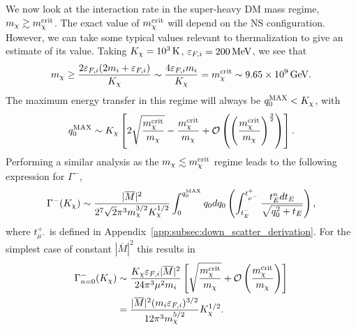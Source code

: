 We now look at the interaction rate in the super-heavy DM mass regime, $m_\chi \gtrsim m_\chi^{\rm crit}$.
The exact value of $m_\chi^{\rm crit}$ will depend on the NS configuration. However, we can take some typical values relevant to thermalization to give an estimate of its value. Taking $K_\chi=10^3{\rm \,K}$, $\varepsilon_{F,i}=200{\rm \,MeV}$, we see that
\begin{equation}
    m_\chi \ge \frac{2\varepsilon_{F,i}(2m_i+\varepsilon_{F,i})}{ K_\chi} \sim \frac{4\varepsilon_{F,i} m_i}{K_\chi} = m_\chi^{\rm crit}\sim 9.65\times10^9{\rm \,GeV}. 
    \label{qpp:eq:mcrit_def}
\end{equation}
The maximum energy transfer in this regime will always be $q_0^{\rm MAX}<K_\chi$, with
\begin{equation}
    q_0^{\rm MAX}\sim K_\chi\left[2\sqrt{\frac{m_\chi^{\rm crit}}{m_\chi }} - \frac{m_\chi^{\rm crit}}{m_\chi } +\mathcal{O}\left(\left(\frac{m_\chi^{\rm crit}}{m_\chi}\right)^{\frac{3}{2}}\right)\right].
 \end{equation}
Performing a similar analysis as the $m_\chi \lesssim m_\chi^{\rm crit}$ regime leads to the following expression for $\Gamma^-$,
\begin{equation}
\Gamma^{-}(K_\chi) \sim \frac{|\overline{M}|^2}{2^7\sqrt{2}\pi^3m_\chi^{3/2}K_\chi^{1/2}}\int_0^{	q_0^{\rm MAX}}q_0 dq_0 \left(\int_{t_{E}^{-}}^{t_{\mu^-}^{+}} \frac{t_E^n dt_E }{\sqrt{q_0^2+t_E}} \right),  
\end{equation} 
where $t_{\mu^-}^+$ is defined in Appendix~\ref{app:subsec:down_scatter_derivation}. 
For the simplest case of constant $|\overline{M}|^2$ this results in 
\begin{align}
\Gamma^{-}_{n=0}(K_\chi) & \sim  
\frac{K_\chi \varepsilon_{F,i} |\overline{M}|^2}{24\pi^3\mu^2m_i}\left[\sqrt{\frac{m_\chi^{\rm crit}}{m_\chi}}+\mathcal{O}\left(\frac{m_\chi^{\rm crit}}{m_\chi}\right)\right] \nonumber\\
& = \frac{|\overline{M}|^2(m_i\varepsilon_{F,i})^{3/2}}{12 \pi^3m_\chi^{5/2}}K_\chi^{1/2}.\label{app:eq:intraten0largem}
\end{align}

